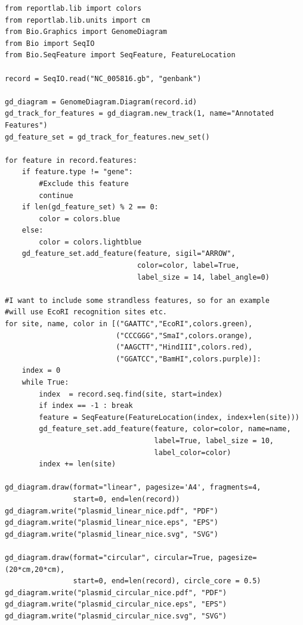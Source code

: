 \documentclass{report}
\begin{document}
\begin{verbatim}
from reportlab.lib import colors
from reportlab.lib.units import cm
from Bio.Graphics import GenomeDiagram
from Bio import SeqIO
from Bio.SeqFeature import SeqFeature, FeatureLocation

record = SeqIO.read("NC_005816.gb", "genbank")

gd_diagram = GenomeDiagram.Diagram(record.id)
gd_track_for_features = gd_diagram.new_track(1, name="Annotated Features")
gd_feature_set = gd_track_for_features.new_set()

for feature in record.features:
    if feature.type != "gene":
        #Exclude this feature
        continue
    if len(gd_feature_set) % 2 == 0:
        color = colors.blue
    else:
        color = colors.lightblue
    gd_feature_set.add_feature(feature, sigil="ARROW",
                               color=color, label=True,
                               label_size = 14, label_angle=0)

#I want to include some strandless features, so for an example
#will use EcoRI recognition sites etc.
for site, name, color in [("GAATTC","EcoRI",colors.green),
                          ("CCCGGG","SmaI",colors.orange),
                          ("AAGCTT","HindIII",colors.red),
                          ("GGATCC","BamHI",colors.purple)]:
    index = 0
    while True:
        index  = record.seq.find(site, start=index)
        if index == -1 : break
        feature = SeqFeature(FeatureLocation(index, index+len(site)))
        gd_feature_set.add_feature(feature, color=color, name=name,
                                   label=True, label_size = 10,
                                   label_color=color)
        index += len(site)

gd_diagram.draw(format="linear", pagesize='A4', fragments=4,
                start=0, end=len(record))
gd_diagram.write("plasmid_linear_nice.pdf", "PDF")
gd_diagram.write("plasmid_linear_nice.eps", "EPS")
gd_diagram.write("plasmid_linear_nice.svg", "SVG")

gd_diagram.draw(format="circular", circular=True, pagesize=(20*cm,20*cm),
                start=0, end=len(record), circle_core = 0.5)
gd_diagram.write("plasmid_circular_nice.pdf", "PDF")
gd_diagram.write("plasmid_circular_nice.eps", "EPS")
gd_diagram.write("plasmid_circular_nice.svg", "SVG")
\end{verbatim}
\end{document}
